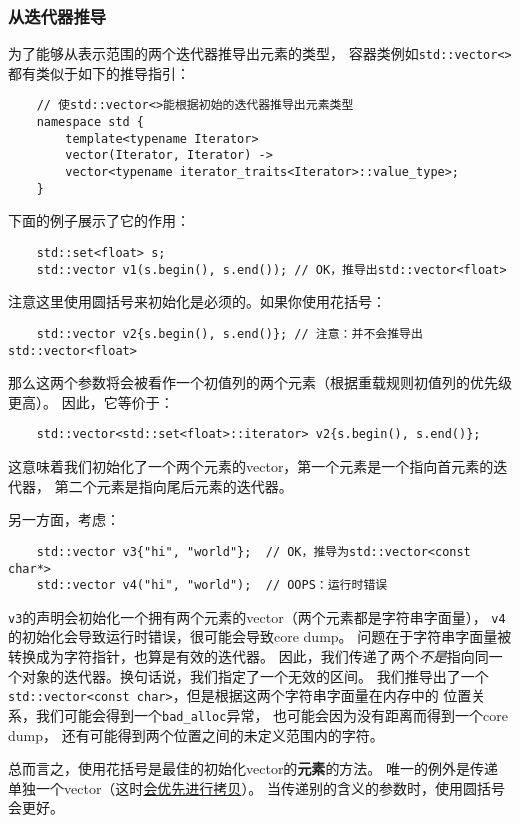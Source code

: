 \subsubsection*{从迭代器推导}
为了能够从表示范围的两个迭代器推导出元素的类型，
容器类例如\texttt{std::vector<>}都有类似于如下的推导指引：
\begin{lstlisting}
    // 使std::vector<>能根据初始的迭代器推导出元素类型
    namespace std {
        template<typename Iterator>
        vector(Iterator, Iterator) ->
        vector<typename iterator_traits<Iterator>::value_type>;
    }
\end{lstlisting}
下面的例子展示了它的作用：
\begin{lstlisting}
    std::set<float> s;
    std::vector v1(s.begin(), s.end()); // OK，推导出std::vector<float>
\end{lstlisting}
注意这里使用圆括号来初始化是必须的。如果你使用花括号：
\begin{lstlisting}
    std::vector v2{s.begin(), s.end()}; // 注意：并不会推导出std::vector<float>
\end{lstlisting}
那么这两个参数将会被看作一个初值列的两个元素（根据重载规则初值列的优先级更高）。
因此，它等价于：
\begin{lstlisting}
    std::vector<std::set<float>::iterator> v2{s.begin(), s.end()};
\end{lstlisting}
这意味着我们初始化了一个两个元素的vector，第一个元素是一个指向首元素的迭代器，
第二个元素是指向尾后元素的迭代器。

另一方面，考虑：
\begin{lstlisting}
    std::vector v3{"hi", "world"};  // OK，推导为std::vector<const char*>
    std::vector v4("hi", "world");  // OOPS：运行时错误
\end{lstlisting}
\texttt{v3}的声明会初始化一个拥有两个元素的vector（两个元素都是字符串字面量），
\texttt{v4}的初始化会导致运行时错误，很可能会导致core dump。
问题在于字符串字面量被转换成为字符指针，也算是有效的迭代器。
因此，我们传递了两个\emph{不是}指向同一个对象的迭代器。换句话说，我们指定了一个无效的区间。
我们推导出了一个\texttt{std::vector<const char>}，但是根据这两个字符串字面量在内存中的
位置关系，我们可能会得到一个\texttt{bad\_alloc}异常，
也可能会因为没有距离而得到一个core dump，
还有可能得到两个位置之间的未定义范围内的字符。

总而言之，使用花括号是最佳的初始化vector的\textbf{元素}的方法。
唯一的例外是传递单独一个vector（这时\hyperref[ch9.1.1]{会优先进行拷贝}）。
当传递别的含义的参数时，使用圆括号会更好。

